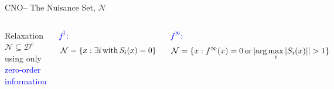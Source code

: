\documentclass[handout,aspectratio=54]{beamer}
\numberwithin{theorem}{section}
\begin{document}
\begin{frame}{CNO– The Nuisance Set,  $\mathcal{N}$}
\begin{columns}
Relaxation $\mathcal{N} \subseteq \mathcal{D}^c$ using only \textcolor{blue}{zero-order information}

\textcolor{blue}{$f^1$:}
\begin{equation*}
\mathcal{N}=\{x:\exists i \,\textup{with}\, S_i(x)=0\}
\end{equation*}


\textcolor{blue}{$f^\infty$:}
\begin{equation*}
\mathcal{N}=\{x:f^\infty(x)=0 \,\textup{or}\, |\textup{arg}\max_i|S_i(x)||>1\}
\end{equation*}

\vspace{4cm}

\includegraphics[width=\textwidth]{fig/52-1.jpg}
\includegraphics[width=\textwidth]{fig/52-2.jpg}
\end{columns}
\end{frame}
\end{document}

